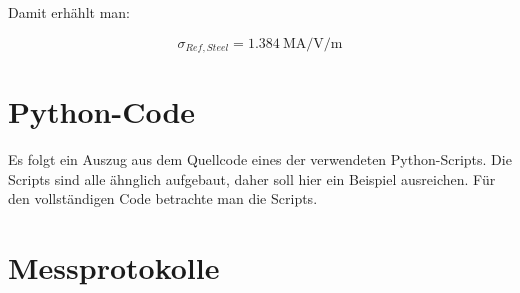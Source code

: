 Damit erh\"ahlt man:

\begin{equation*}
    \sigma_{Ref,Steel} = \SI{1.384}{\mega\ampere\per\volt\per\meter}
\end{equation*}


\clearpage
\section{Python-Code}
\label{app:python}

Es   folgt   ein   Auszug   aus    dem   Quellcode   eines   der   verwendeten
Python-Scripts. Die Scripts  sind alle  \"ahnglich aufgebaut, daher  soll hier
ein  Beispiel ausreichen. F\"ur  den  vollst\"andigen Code  betrachte man  die
Scripts.


\clearpage
\section{Messprotokolle}
\label{app:protocols}
%
